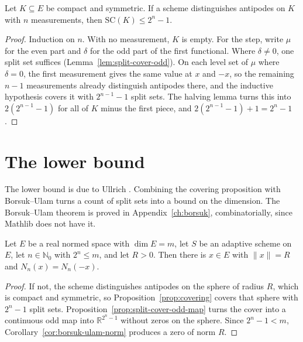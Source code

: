 \begin{proposition}
\label{prop:covering}
\leanok
{}
Let $K \subseteq E$ be compact and symmetric. If a scheme distinguishes antipodes on
$K$ with $n$ measurements, then $\mathrm{SC}(K) \le 2^n - 1$.
\end{proposition}
\begin{proof}
\leanok
{}
Induction on $n$. With no measurement, $K$ is empty. For the step, write $\mu$ for the
even part and $\delta$ for the odd part of the first functional. Where $\delta \neq 0$,
one split set suffices (Lemma~\ref{lem:split-cover-odd}). On each level set of $\mu$
where $\delta = 0$, the first measurement gives the same value at $x$ and $-x$, so the
remaining $n - 1$ measurements already distinguish antipodes there, and the inductive
hypothesis covers it with $2^{n-1} - 1$ split sets. The halving lemma turns this into
$2(2^{n-1} - 1)$ for all of $K$ minus the first piece, and
$2(2^{n-1} - 1) + 1 = 2^n - 1$.
\end{proof}

\chapter{The lower bound}
\label{ch:lower}

The lower bound is due to Ullrich \cite{U26}. Combining the covering proposition with
Borsuk--Ulam turns a count of split sets into a bound on the dimension. The
Borsuk--Ulam theorem is proved in Appendix~\ref{ch:borsuk}, combinatorially, since
Mathlib does not have it.

\begin{theorem}
\label{thm:antipodal-coincidence}
\leanok
{}
Let $E$ be a real normed space with $\dim E = m$, let $S$ be an adaptive scheme on $E$,
let $n \in \mathbb{N}_0$ with $2^n \le m$, and let $R > 0$. Then there is $x \in E$ with
$\|x\| = R$ and $N_n(x) = N_n(-x)$.
\end{theorem}
\begin{proof}
\leanok
{}
If not, the scheme distinguishes antipodes on the sphere of radius $R$, which is
compact and symmetric, so Proposition~\ref{prop:covering} covers that sphere with
$2^n - 1$ split sets. Proposition~\ref{prop:split-cover-odd-map} turns the cover into a
continuous odd map into $\mathbb{R}^{2^n - 1}$ without zeros on the sphere. Since
$2^n - 1 < m$, Corollary~\ref{cor:borsuk-ulam-norm} produces a zero of norm $R$.
\end{proof}

